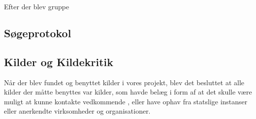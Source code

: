 Efter der blev gruppe

\subsection{Søgeprotokol}

\subsection{Kilder og Kildekritik}

Når der blev fundet og benyttet kilder i vores projekt, blev det besluttet at alle kilder der måtte benyttes var kilder, som havde belæg i form af at det skulle være muligt at kunne kontakte vedkommende , eller have ophav fra statslige instanser eller anerkendte virksomheder og organisationer. 